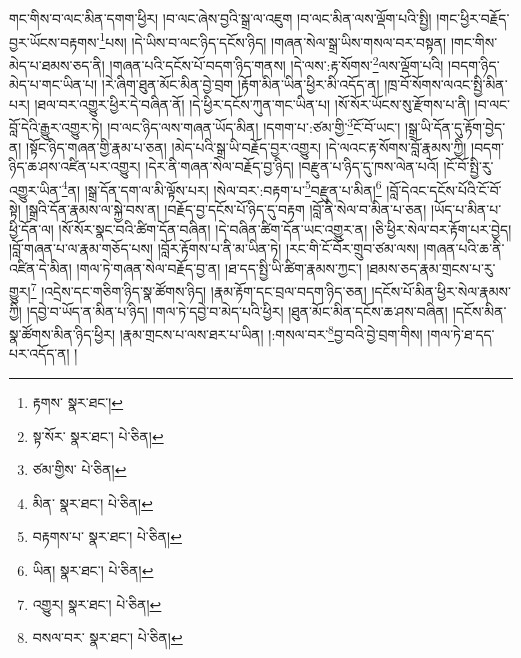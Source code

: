 གང་གིས་བ་ལང་མིན་དགག་ཕྱིར། །བ་ལང་ཞེས་བྱའི་སྒྲ་ལ་འཇུག །བ་ལང་མིན་ལས་ལྡོག་པའི་སྤྱི། །གང་ཕྱིར་བརྗོད་བྱར་ཡོངས་བརྟགས་\footnote{རྟགས་  སྣར་ཐང་། }པས། །དེ་ཡིས་བ་ལང་ཉིད་དངོས་ཉིད། །གཞན་སེལ་སྒྲ་ཡིས་གསལ་བར་བསྟན། །གང་གིས་མེད་པ་ཐམས་ཅད་ནི། །གཞན་པའི་དངོས་པོ་བདག་ཉིད་གནས། །དེ་ལས་:རྟ་སོགས་\footnote{སྟ་སོར་  སྣར་ཐང་།  པེ་ཅིན། }ལས་ལྡོག་པའི། །བདག་ཉིད་མེད་པ་གང་ཡིན་པ། །རེ་ཞིག་ཐུན་མོང་མིན་བྱེ་བྲག །རྟོག་མིན་ཡིན་ཕྱིར་མི་འདོད་ན། །ཁྲ་བོ་སོགས་ལའང་སྤྱི་མིན་པར། །ཐལ་བར་འགྱུར་ཕྱིར་དེ་བཞིན་ནོ། །དེ་ཕྱིར་དངོས་ཀུན་གང་ཡིན་པ། །སོ་སོར་ཡོངས་སུ་རྫོགས་པ་ནི། །བ་ལང་བློ་དེའི་རྒྱུར་འགྱུར་ཏེ། །བ་ལང་ཉིད་ལས་གཞན་ཡོད་མིན། །དགག་པ་:ཙམ་གྱི་\footnote{ཙམ་གྱིས་  པེ་ཅིན། }ངོ་བོ་ཡང་། །སྒྲ་ཡི་དོན་དུ་རྟོག་བྱེད་ན། །སྟོང་ཉིད་གཞན་གྱི་རྣམ་པ་ཅན། །མེད་པའི་སྒྲ་ཡི་བརྗོད་བྱར་འགྱུར། །དེ་ལའང་རྟ་སོགས་བློ་རྣམས་ཀྱི། །བདག་ཉིད་ཆ་ཤས་འཛིན་པར་འགྱུར། །དེར་ནི་གཞན་སེལ་བརྗོད་བྱ་ཉིད། །བརྫུན་པ་ཉིད་དུ་ཁས་ལེན་པའོ། །ངོ་བོ་སྤྱི་རུ་འགྱུར་ཡིན་\footnote{མིན་  སྣར་ཐང་།  པེ་ཅིན། }ན། །སྒྲ་དོན་དག་ལ་མི་ལྟོས་པར། །སེལ་བར་:བརྟག་པ་\footnote{བརྟགས་པ་  སྣར་ཐང་།  པེ་ཅིན། }བརྫུན་པ་མིན།\footnote{ཡིན།  སྣར་ཐང་།  པེ་ཅིན། } །བློ་དེའང་དངོས་པོའི་ངོ་བོ་སྟེ། །སྒྲའི་དོན་རྣམས་ལ་སྐྱེ་བས་ན། །བརྗོད་བྱ་དངོས་པོ་ཉིད་དུ་བརྟག །བློ་ནི་སེལ་བ་མིན་པ་ཅན། །ཡོད་པ་མིན་པ་ཕྱི་དོན་ལ། །སོ་སོར་སྣང་བའི་ཚིག་དོན་བཞིན། །དེ་བཞིན་ཚིག་དོན་ཡང་འགྱུར་ན། །ཅི་ཕྱིར་སེལ་བར་རྟོག་པར་བྱེད། །བློ་གཞན་པ་ལ་རྣམ་གཅོད་པས། །བློར་རྟོགས་པ་ནི་མ་ཡིན་ཏེ། །རང་གི་ངོ་བོར་གྲུབ་ཙམ་ལས། །གཞན་པའི་ཆ་ནི་འཛིན་དེ་མིན། །གལ་ཏེ་གཞན་སེལ་བརྗོད་བྱ་ན། །ཐ་དད་སྤྱི་ཡི་ཚིག་རྣམས་ཀྱང་། །ཐམས་ཅད་རྣམ་གྲངས་པ་རུ་གྱུར།\footnote{འགྱུར།  སྣར་ཐང་།  པེ་ཅིན། } །འདྲེས་དང་གཅིག་ཉིད་སྣ་ཚོགས་ཉིད། །རྣམ་རྟོག་དང་བྲལ་བདག་ཉིད་ཅན། །དངོས་པོ་མིན་ཕྱིར་སེལ་རྣམས་ཀྱི། །དབྱེ་བ་ཡོད་ན་མིན་པ་ཉིད། །གལ་ཏེ་དབྱེ་བ་མེད་པའི་ཕྱིར། །ཐུན་མོང་མིན་དངོས་ཆ་ཤས་བཞིན། །དངོས་མིན་སྣ་ཚོགས་མིན་ཉིད་ཕྱིར། །རྣམ་གྲངས་པ་ལས་ཐར་པ་ཡིན། །:གསལ་བར་\footnote{བསལ་བར་  སྣར་ཐང་།  པེ་ཅིན། }བྱ་བའི་བྱེ་བྲག་གིས། །གལ་ཏེ་ཐ་དད་པར་འདོད་ན། །
